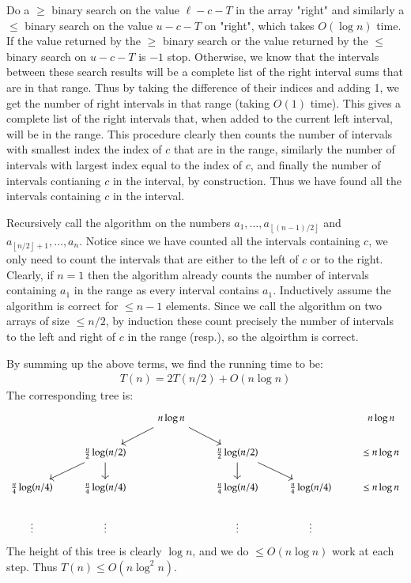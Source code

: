 \documentclass[12pt]{article}
\theoremstyle{definitionstyle}
\newcommand{\floor}[1]{\left\lfloor#1\right\rfloor}
\begin{document}
    Do a $\geq$ binary search on the value $\ell-c-T$ in the array "right" and similarly a $\leq$ binary search on the value $u-c-T$ on "right", which takes $O(\log n)$ time. If the value returned by the $\geq$ binary search or the value returned by the $\leq$ binary search on $u-c-T$ is $-1$ stop. Otherwise, we know that the intervals between these search results will be a complete list of the right interval sums that are in that range. Thus by taking the difference of their indices and adding 1, we get the number of right intervals in that range (taking $O(1)$ time). This gives a complete list of the right intervals that, when added to the current left interval, will be in the range. This procedure clearly then counts the number of intervals with smallest index the index of $c$ that are in the range, similarly the number of intervals with largest index equal to the index of $c$, and finally the number of intervals contianing $c$ in the interval, by construction. Thus we have found all the intervals containing $c$ in the interval. 
    
    Recursively call the algorithm on the numbers $a_1, \ldots, a_{\floor{(n-1)/2}}$ and $a_{\floor{n/2} + 1}, \ldots, a_n$. Notice since we have counted all the intervals containing $c$, we only need to count the intervals that are either to the left of $c$ or to the right. Clearly, if $n = 1$ then the algorithm already counts the number of intervals containing $a_1$ in the range as every interval contains $a_1$. Inductively assume the algorithm is correct for $\leq n-1$ elements. Since we call the algorithm on two arrays of size $\leq n/2$, by induction these count precisely the number of intervals to the left and right of $c$ in the range (resp.), so the algoirthm is correct.
    
    By summing up the above terms, we find the running time to be:
    \begin{align*}
        T(n) = 2T(n/2) + O(n\log n)
    \end{align*}
    The corresponding tree is:
    \[\begin{tikzcd}
        && {n\log n} &&& {n\log n} \\
        & {\frac{n}{2}\log(n/2)} && {\frac{n}{2}\log(n/2)} && {\leq n\log n} \\
        {\frac{n}4\log(n/4)} & {\frac{n}4\log(n/4)} && {\frac{n}4\log(n/4)} & {\frac{n}4\log(n/4)} & {\leq n\log n} \\
        \vdots & \vdots && \vdots & \vdots
        \arrow[from=1-3, to=2-2]
        \arrow[from=1-3, to=2-4]
        \arrow[from=2-2, to=3-1]
        \arrow[from=2-2, to=3-2]
        \arrow[from=2-4, to=3-4]
        \arrow[from=2-4, to=3-5]
    \end{tikzcd}\]
    The height of this tree is clearly $\log n$, and we do $\leq O(n\log n)$ work at each step. Thus $T(n) \leq O(n\log^2n)$.
    
\end{document}
